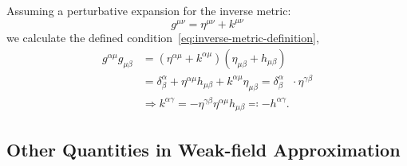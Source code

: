 Assuming a perturbative expansion for the inverse metric:
\begin{equation}
    g^{\mu\nu} = \eta^{\mu\nu} + k^{\mu\nu}\label{eq:inverse-metric-perturbation}
\end{equation}
we calculate the defined condition~\ref{eq:inverse-metric-definition},
\begin{align}
    g^{\alpha\mu}g_{\mu\beta} &= (\eta^{\alpha\mu} + k^{\alpha\mu})(\eta_{\mu\beta} + h_{\mu\beta}) \nonumber \\
    &= \delta^{\alpha}_{\beta} + \eta^{\alpha\mu} h_{\mu\beta} + k^{\alpha\mu}\eta_{\mu\beta} = \delta^{\alpha}_{\beta}\nonumber \ \ \ \cdot\eta^{\gamma\beta}  \\
    &\Rightarrow k^{\alpha\gamma} = - \eta^{\gamma\beta}\eta^{\alpha\mu} h_{\mu\beta} \eqqcolon -h^{\alpha\gamma}.\label{eq:inverse-metric-calculation-step}
\end{align}

\subsection{Other Quantities in Weak-field Approximation}\label{subsec:other-quantities-in-weak-field-approximation}

